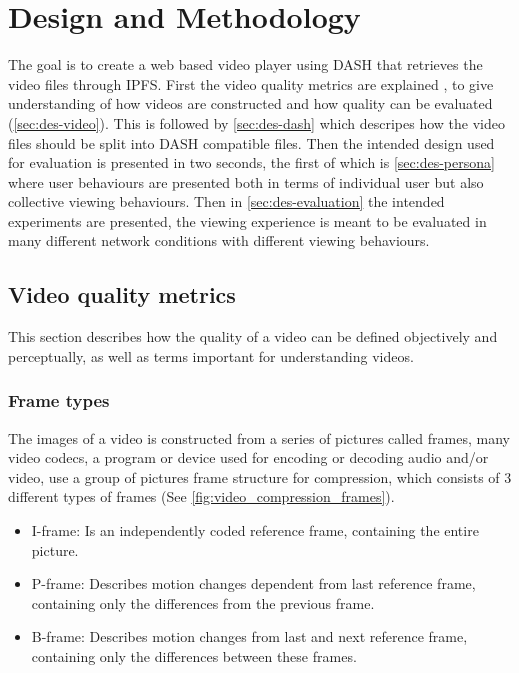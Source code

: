 \chapter{Design and Methodology}
\label{cha:design-and-method}

The goal is to create a web based video player using \ac{DASH} that retrieves the video files through \ac{IPFS}. First the video quality metrics are explained , to give understanding of how videos are constructed and how quality can be evaluated (\autoref{sec:des-video}). This is followed by \autoref{sec:des-dash} which descripes how the video files should be split into \ac{DASH} compatible files. Then the intended design used for evaluation is presented in two seconds, the first of which is \autoref{sec:des-persona} where user behaviours are presented both in terms of individual user but also collective viewing behaviours. Then in \autoref{sec:des-evaluation} the intended experiments are presented, the viewing experience is meant to be evaluated in many different network conditions with different viewing behaviours.

\section{Video quality metrics}
\label{sec:des-video}
This section describes how the quality of a video can be defined objectively and perceptually, as well as terms important for understanding videos.

\subsection{Frame types}
The images of a video is constructed from a series of pictures called frames, many video codecs, a program or device used for encoding or decoding audio and/or video, use a group of pictures frame structure for compression, which consists of 3 different types of frames (See \autoref{fig:video_compression_frames}).

\begin{itemize}
    \item \ac{I-frame}: Is an independently coded reference frame, containing the entire picture.
    \item \ac{P-frame}: Describes motion changes dependent from last reference frame, containing only the differences from the previous frame.
    \item \ac{B-frame}: Describes motion changes from last and next reference frame, containing only the differences between these frames.
\end{itemize}

